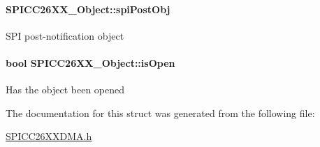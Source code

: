 \paragraph[{spi\+Post\+Obj}]{ S\+P\+I\+C\+C26\+X\+X\+\_\+\+Object\+::spi\+Post\+Obj}\label{struct_s_p_i_c_c26_x_x___object_ad5d62652fb04c0cc1d27e20beaaa7d8f}
S\+P\+I post-\/notification object 
\paragraph[{is\+Open}]{\setlength{\rightskip}{0pt plus 5cm}bool S\+P\+I\+C\+C26\+X\+X\+\_\+\+Object\+::is\+Open}\label{struct_s_p_i_c_c26_x_x___object_aad3b6548b2adec791c856b725f3d768b}
Has the object been opened 

The documentation for this struct was generated from the following file\+:\begin{DoxyCompactItemize}
\item 
\hyperlink{_s_p_i_c_c26_x_x_d_m_a_8h}{S\+P\+I\+C\+C26\+X\+X\+D\+M\+A.\+h}\end{DoxyCompactItemize}
